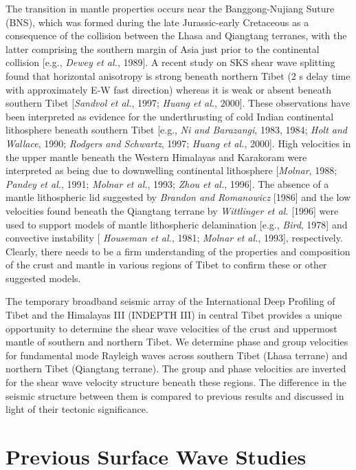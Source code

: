 \documentclass[12pt]{article}
\begin{document}
The transition in mantle properties occurs near the Banggong-Nujiang Suture (BNS), which was formed during 
the late Jurassic-early Cretaceous as a consequence of the collision between the Lhasa and Qiangtang 
terranes, with the latter comprising the southern margin of Asia just prior to the continental collision 
[e.g., {\it Dewey et al.}, 1989].  A recent study on SKS shear wave splitting found that horizontal 
anisotropy is strong beneath northern Tibet (2 s delay time with approximately E-W fast direction) whereas 
it is weak or absent beneath southern Tibet [{\it Sandvol et al.}, 1997; {\it Huang et al.}, 2000].  These 
observations have been interpreted as evidence for the underthrusting of cold Indian continental 
lithosphere beneath southern Tibet [e.g., {\it Ni and Barazangi}, 1983, 1984; {\it Holt and Wallace}, 1990; 
{\it Rodgers and Schwartz}, 1997; {\it Huang et al.}, 2000].  High velocities in the upper mantle beneath 
the Western Himalayas and Karakoram were interpreted as being due to downwelling continental lithosphere 
[{\it Molnar}, 1988; {\it Pandey et al.}, 1991; {\it Molnar et al.}, 1993; {\it Zhou et al.}, 1996].  The 
absence of a mantle lithospheric lid suggested by {\it Brandon and Romanowicz} [1986] and the low 
velocities found beneath the Qiangtang terrane by {\it Wittlinger et al.} [1996] were used to support 
models of mantle lithospheric delamination [e.g., {\it Bird}, 1978] and convective instability [{\it 
Houseman et al.}, 1981; {\it Molnar et al.}, 1993], respectively.  Clearly, there needs to be a firm 
understanding of the properties and composition of the crust and mantle in various regions of Tibet to 
confirm these or other suggested models. 

The temporary broadband seismic array of the International Deep Profiling of Tibet and the Himalayas III 
(INDEPTH III) in central Tibet provides a unique opportunity to determine the shear wave velocities of the 
crust and uppermost mantle of southern and northern Tibet. We determine phase and group velocities for 
fundamental mode Rayleigh waves across southern Tibet (Lhasa terrane) and northern Tibet (Qiangtang 
terrane).  The group and phase velocities are inverted for the shear wave velocity structure beneath these 
regions. The difference in the seismic structure between them is compared to previous results and discussed 
in light of their tectonic significance. 

\section{Previous Surface Wave Studies} 
\end{document}
